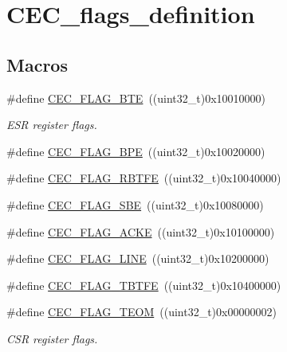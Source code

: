 \hypertarget{group___c_e_c__flags__definition}{}\section{C\+E\+C\+\_\+flags\+\_\+definition}
\label{group___c_e_c__flags__definition}
\subsection*{Macros}
\begin{DoxyCompactItemize}
\item 
\#define \mbox{\hyperlink{group___c_e_c__flags__definition_ga66e91438a7df5d00db3c5410d8f7d456}{C\+E\+C\+\_\+\+F\+L\+A\+G\+\_\+\+B\+TE}}~((uint32\+\_\+t)0x10010000)
\begin{DoxyCompactList}\small\item\em E\+SR register flags. \end{DoxyCompactList}\item 
\#define \mbox{\hyperlink{group___c_e_c__flags__definition_gaf2a5d5dcbc57fc0cf7cfa988533a2a09}{C\+E\+C\+\_\+\+F\+L\+A\+G\+\_\+\+B\+PE}}~((uint32\+\_\+t)0x10020000)
\item 
\#define \mbox{\hyperlink{group___c_e_c__flags__definition_gafdfca815014dee4a458083337795c336}{C\+E\+C\+\_\+\+F\+L\+A\+G\+\_\+\+R\+B\+T\+FE}}~((uint32\+\_\+t)0x10040000)
\item 
\#define \mbox{\hyperlink{group___c_e_c__flags__definition_gac77db62c05af2462ed3f1b64cef2e136}{C\+E\+C\+\_\+\+F\+L\+A\+G\+\_\+\+S\+BE}}~((uint32\+\_\+t)0x10080000)
\item 
\#define \mbox{\hyperlink{group___c_e_c__flags__definition_ga1583b7a221e54f2f19cb121bf310547c}{C\+E\+C\+\_\+\+F\+L\+A\+G\+\_\+\+A\+C\+KE}}~((uint32\+\_\+t)0x10100000)
\item 
\#define \mbox{\hyperlink{group___c_e_c__flags__definition_gaf751970725df12976dc6c8356910143a}{C\+E\+C\+\_\+\+F\+L\+A\+G\+\_\+\+L\+I\+NE}}~((uint32\+\_\+t)0x10200000)
\item 
\#define \mbox{\hyperlink{group___c_e_c__flags__definition_gaae90fd2f95085e113b6943bb35d899ba}{C\+E\+C\+\_\+\+F\+L\+A\+G\+\_\+\+T\+B\+T\+FE}}~((uint32\+\_\+t)0x10400000)
\item 
\#define \mbox{\hyperlink{group___c_e_c__flags__definition_gad0adfb11294f562f2c8dc555f69e25e0}{C\+E\+C\+\_\+\+F\+L\+A\+G\+\_\+\+T\+E\+OM}}~((uint32\+\_\+t)0x00000002)
\begin{DoxyCompactList}\small\item\em C\+SR register flags. \end{DoxyCompactList}\item 

\end{DoxyCompactItemize}
